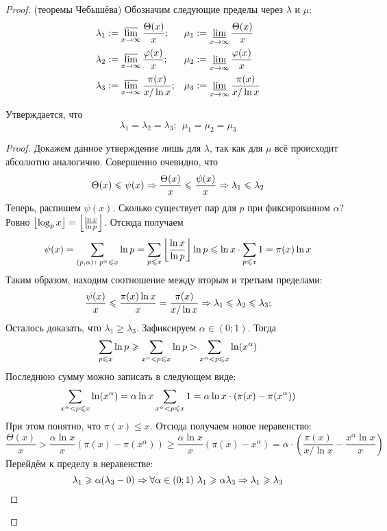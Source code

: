 \begin{proof} (теоремы Чебышёва)
	Обозначим следующие пределы через $\lambda$ и $\mu$:
	\begin{align*}
		&{\lambda_1 := \varlimsup\limits_{x \to \infty} \frac{\Theta(x)}{x};} & &{\mu_1 := \varliminf\limits_{x \to \infty} \frac{\Theta(x)}{x}} \\
		&{\lambda_2 := \varlimsup\limits_{x \to \infty} \frac{\phi(x)}{x};} & &{\mu_2 := \varliminf\limits_{x \to \infty} \frac{\phi(x)}{x}} \\
		&{\lambda_3 := \varlimsup\limits_{x \to \infty} \frac{\pi(x)}{x / \ln x};} & &{\mu_3 := \varliminf\limits_{x \to \infty} \frac{\pi(x)}{x / \ln x}}
	\end{align*}
	
	\begin{lemma}
		Утверждается, что
		\[
			\lambda_1 = \lambda_2 = \lambda_3;\ \ \mu_1 = \mu_2 = \mu_3
		\]
	\end{lemma}

	\begin{proof}
		Докажем данное утверждение лишь для $\lambda$, так как для $\mu$ всё происходит абсолютно аналогично. Совершенно очевидно, что
		\[
			\Theta(x) \le \psi(x) \Ra \frac{\Theta(x)}{x} \le \frac{\psi(x)}{x} \Ra \lambda_1 \le \lambda_2
		\]
		Теперь, распишем $\psi(x)$. Сколько существует пар для $p$ при фиксированном $\alpha$? Ровно $\floor{\log_p x} = \floor{\frac{\ln x}{\ln p}}$. Отсюда получаем
		\[
			\psi(x) = \suml_{(p, \alpha) \colon p^\alpha \le x} \ln p = \suml_{p \le x} \floor{\frac{\ln x}{\ln p}} \ln p \le \ln x \cdot \suml_{p \le x} 1 = \pi(x) \ln x
		\]
		Таким образом, находим соотношение между вторым и третьим пределами:
		\[
		 	\frac{\psi(x)}{x} \le \frac{\pi(x) \ln x}{x} = \frac{\pi(x)}{x / \ln x} \Ra \lambda_1 \le \lambda_2 \le \lambda_3;
		\]
		Осталось доказать, что $\lambda_1 \ge \lambda_3$. Зафиксируем $\alpha \in (0; 1)$. Тогда
		\[
			\suml_{p \le x} \ln p \ge \suml_{x^\alpha < p \le x} \ln p > \suml_{x^\alpha < p \le x} \ln (x^\alpha)
		\]
		Последнюю сумму можно записать в следующем виде:
		\[
			\suml_{x^\alpha < p \le x} \ln (x^\alpha) = \alpha \ln x \suml_{x^\alpha < p \le x} 1 = \alpha \ln x \cdot (\pi(x) - \pi(x^\alpha))
		\]
		При этом понятно, что $\pi(x) \le x$. Отсюда получаем новое неравенство:
		\[
			\frac{\Theta(x)}{x} > \frac{\alpha \ln x}{x} (\pi(x) - \pi(x^\alpha)) \ge \frac{\alpha \ln x}{x}(\pi(x) - x^\alpha) = \alpha \cdot \left(\frac{\pi(x)}{x / \ln x} - \frac{x^\alpha \ln x}{x}\right)
		\]
		Перейдём к пределу в неравенстве:
		\[
			\lambda_1 \ge \alpha (\lambda_3 - 0) \Ra \forall \alpha \in (0; 1)\ \lambda_1 \ge \alpha \lambda_3 \Ra \lambda_1 \ge \lambda_3
		\]
	\end{proof}


\end{proof}
